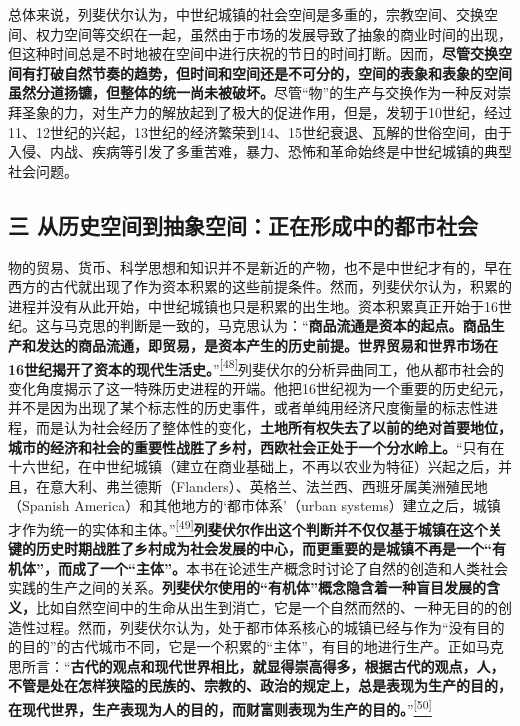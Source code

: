 \documentclass[UTF8, fontset = sourcesans, a4paper, oneside, zihao =
-4, scheme=chinese, no-math, space=true]{ctexbook}
\begin{document}
总体来说，列斐伏尔认为，中世纪城镇的社会空间是多重的，宗教空间、交换空间、权力空间等交织在一起，虽然由于市场的发展导致了抽象的商业时间的出现，但这种时间总是不时地被在空间中进行庆祝的节日的时间打断。因而，\textbf{尽管交换空间有打破自然节奏的趋势，但时间和空间还是不可分的，空间的表象和表象的空间虽然分道扬镳，但整体的统一尚未被破坏。}尽管``物''的生产与交换作为一种反对崇拜圣象的力，对生产力的解放起到了极大的促进作用，但是，发轫于10世纪，经过11、12世纪的兴起，13世纪的经济繁荣到14、15世纪衰退、瓦解的世俗空间，由于入侵、内战、疾病等引发了多重苦难，暴力、恐怖和革命始终是中世纪城镇的典型社会问题。

\subsection{三
从历史空间到抽象空间：正在形成中的都市社会}\label{part0006_split_003.htmlux5cux23c023}

物的贸易、货币、科学思想和知识并不是新近的产物，也不是中世纪才有的，早在西方的古代就出现了作为资本积累的这些前提条件。然而，列斐伏尔认为，积累的进程并没有从此开始，中世纪城镇也只是积累的出生地。资本积累真正开始于16世纪。这与马克思的判断是一致的，马克思认为：``\textbf{商品流通是资本的起点。商品生产和发达的商品流通，即贸易，是资本产生的历史前提。世界贸易和世界市场在16世纪揭开了资本的现代生活史。}''\protect\hypertarget{part0006_split_003.htmlux5cux23w48}{}{}\protect\hyperlink{part0006_split_003.htmlux5cux23m48}{\textsuperscript{{[}48{]}}}列斐伏尔的分析异曲同工，他从都市社会的变化角度揭示了这一特殊历史进程的开端。他把16世纪视为一个重要的历史纪元，并不是因为出现了某个标志性的历史事件，或者单纯用经济尺度衡量的标志性进程，而是认为社会经历了整体性的变化，\textbf{土地所有权失去了以前的绝对首要地位，城市的经济和社会的重要性战胜了乡村，西欧社会正处于一个分水岭上。}``只有在十六世纪，在中世纪城镇（建立在商业基础上，不再以农业为特征）兴起之后，并且，在意大利、弗兰德斯（Flanders）、英格兰、法兰西、西班牙属美洲殖民地（Spanish America）和其他地方的`都市体系'（urban systems）建立之后，城镇才作为统一的实体和主体。''\protect\hypertarget{part0006_split_003.htmlux5cux23w49}{}{}\protect\hyperlink{part0006_split_003.htmlux5cux23m49}{\textsuperscript{{[}49{]}}}\textbf{列斐伏尔作出这个判断并不仅仅基于城镇在这个关键的历史时期战胜了乡村成为社会发展的中心，而更重要的是城镇不再是一个``有机体''，而成了一个``主体''。}本书在论述生产概念时讨论了自然的创造和人类社会实践的生产之间的关系。\textbf{列斐伏尔使用的``有机体''概念隐含着一种盲目发展的含义，}比如自然空间中的生命从出生到消亡，它是一个自然而然的、一种无目的的创造性过程。然而，列斐伏尔认为，处于都市体系核心的城镇已经与作为``没有目的的目的''的古代城市不同，它是一个积累的``主体''，有目的地进行生产。正如马克思所言：``\textbf{古代的观点和现代世界相比，就显得崇高得多，根据古代的观点，人，不管是处在怎样狭隘的民族的、宗教的、政治的规定上，总是表现为生产的目的，在现代世界，生产表现为人的目的，而财富则表现为生产的目的。}''\protect\hypertarget{part0006_split_003.htmlux5cux23w50}{}{}\protect\hyperlink{part0006_split_003.htmlux5cux23m50}{\textsuperscript{{[}50{]}}}
\end{document}
